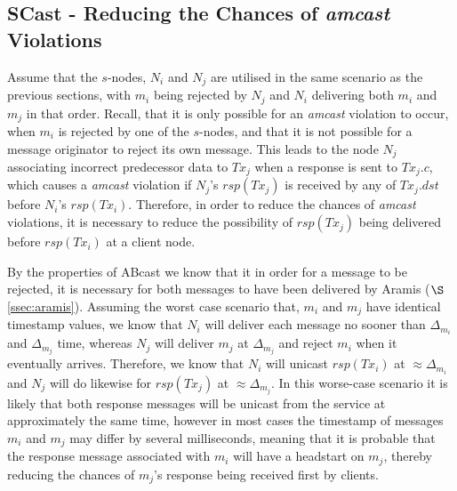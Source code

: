     \subsection{SCast - Reducing the Chances of \emph{amcast} Violations}
    Assume that the $s$-nodes, $N_i$ and $N_j$ are utilised in the same scenario as the previous sections, with $m_i$ being rejected by $N_j$ and $N_i$ delivering both $m_i$ and $m_j$ in that order.  Recall, that it is only possible for an \emph{amcast} violation to occur, when $m_i$ is rejected by one of the $s$-nodes, and that it is not possible for a message originator to reject its own message.  This leads to the node $N_j$ associating incorrect predecessor data to $Tx_j$ when a response is sent to $Tx_j.c$, which causes a \emph{amcast} violation if $N_j$'s $rsp(Tx_j)$ is received by any of $Tx_j.dst$ before $N_i$'s $rsp(Tx_i)$.  Therefore, in order to reduce the chances of \emph{amcast} violations, it is necessary to reduce the possibility of $rsp(Tx_j)$ being delivered before $rsp(Tx_i)$ at a client node.  
    
    By the properties of \textsf{ABcast} we know that it in order for a message to be rejected, it is necessary for both messages to have been delivered by \textsf{Aramis} ($\S$ \ref{ssec:aramis}).  Assuming the worst case scenario that, $m_i$ and $m_j$ have identical timestamp values, we know that $N_i$ will deliver each message no sooner than $\Delta_{m_i}$ and $\Delta_{m_j}$ time, whereas $N_j$ will deliver $m_j$ at $\Delta_{m_j}$ and reject $m_i$ when it eventually arrives.  Therefore, we know that $N_i$ will unicast $rsp(Tx_i)$ at $\approx \Delta_{m_i}$ and $N_j$ will do likewise for $rsp(Tx_j)$ at $\approx \Delta_{m_j}$.  In this worse-case scenario it is likely that both response messages will be unicast from the service at approximately the same time, however in most cases the timestamp of messages $m_i$ and $m_j$ may differ by several milliseconds, meaning that it is probable that the response message associated with $m_i$ will have a headstart on $m_j$, thereby reducing the chances of $m_j$'s response being received first by clients.  
    
